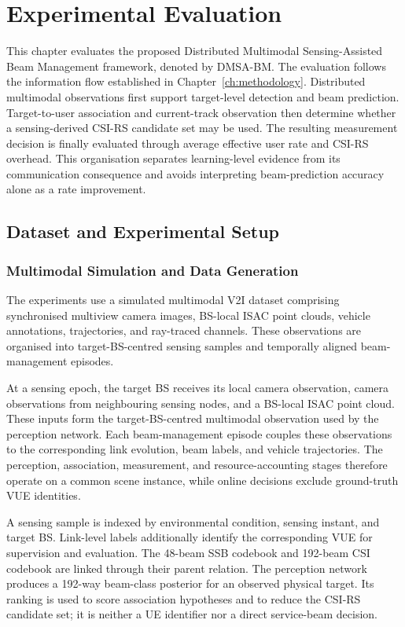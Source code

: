 \chapter{Experimental Evaluation}
\label{ch:experiments}

This chapter evaluates the proposed Distributed Multimodal Sensing-Assisted
Beam Management framework, denoted by DMSA-BM.  The evaluation follows the
information flow established in Chapter~\ref{ch:methodology}.  Distributed
multimodal observations first support target-level detection and beam
prediction.  Target-to-user association and current-track observation then
determine whether a sensing-derived CSI-RS candidate set may be used.  The
resulting measurement decision is finally evaluated through average effective
user rate and CSI-RS overhead.  This organisation separates learning-level
evidence from its communication consequence and avoids interpreting
beam-prediction accuracy alone as a rate improvement.

\section{Dataset and Experimental Setup}
\label{sec:experiments-dataset}

\subsection{Multimodal Simulation and Data Generation}
\label{subsec:experiments-data-generation}

The experiments use a simulated multimodal V2I dataset comprising synchronised
multiview camera images, BS-local ISAC point clouds, vehicle annotations,
trajectories, and ray-traced channels.  These observations are organised into
target-BS-centred sensing samples and temporally aligned beam-management
episodes.

At a sensing epoch, the target BS receives its local camera observation, camera
observations from neighbouring sensing nodes, and a BS-local ISAC point cloud.
These inputs form the target-BS-centred multimodal observation used by the
perception network.  Each beam-management episode couples these observations to
the corresponding link evolution, beam labels, and vehicle trajectories.  The
perception, association, measurement, and resource-accounting stages therefore
operate on a common scene instance, while online decisions exclude ground-truth
VUE identities.

A sensing sample is indexed by environmental condition, sensing instant, and
target BS.  Link-level labels additionally identify the corresponding VUE for
supervision and evaluation.  The 48-beam SSB codebook and 192-beam CSI
codebook are linked through their parent relation.  The perception network
produces a 192-way beam-class posterior for an observed physical target.  Its
ranking is used to score association hypotheses and to reduce the CSI-RS
candidate set; it is neither a UE identifier nor a direct service-beam decision.

